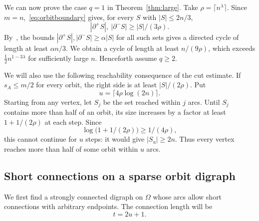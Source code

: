 \documentclass[11pt,a4paper,reqno]{amsart}
\theoremstyle{definition}
\theoremstyle{remark}
\numberwithin{equation}{section}
\begin{document}
We can now prove the case $q=1$ in Theorem~\ref{thm:large}. Take $\rho=\lceil n^\lambda\rceil$. Since $m=n$,~\eqref{eq:orbitboundary} gives, for every $S$ with $|S|\le2n/3$,
\[
 |\partial^+S|,\ |\partial^-S|\ge |S|/(3\rho).
\]
By~\cite[Lemma 2.4]{BHMSY}, the bounds $|\partial^+S|,|\partial^-S|\ge\alpha|S|$ for all such sets gives a directed cycle of length at least $\alpha n/3$. We obtain a cycle of length at least $n/(9\rho)$, which exceeds $\tfrac12n^{1-3\lambda}$ for sufficiently large $n$. Henceforth assume $q\ge2$.

We will also use the following reachability consequence of the cut estimate. If $s_A\le m/2$ for every orbit, the right side is at least $|S|/(2\rho)$. Put
\[
 u=\lceil4\rho\log(2n)\rceil.
\]
Starting from any vertex, let $S_j$ be the set reached within $j$ arcs. Until $S_j$ contains more than half of an orbit, its size increases by a factor at least $1+1/(2\rho)$ at each step. Since
\[
 \log\bigl(1+1/(2\rho)\bigr)\ge1/(4\rho),
\]
this cannot continue for $u$ steps: it would give $|S_u|\ge2n$. Thus every vertex reaches more than half of some orbit within $u$ arcs.


\subsection{Short connections on a sparse orbit digraph}
We first find a strongly connected digraph on $\Omega$ whose arcs allow short connections with arbitrary endpoints. The connection length will be
\begin{equation}\label{eq:connectionlength}
 t=2u+1.
\end{equation}
\end{document}
